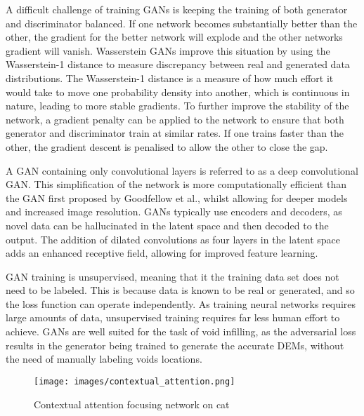 \documentclass[twocolumn]{article}
\begin{document}
A difficult challenge of training GANs is keeping the training of both generator and discriminator balanced.
If one network becomes substantially better than the other, the gradient for the better network will explode and the other networks gradient will vanish.
Wasserstein GANs\autocite{arjovskyWassersteinGenerativeAdversarial2017} improve this situation by using the Wasserstein-1 distance to measure discrepancy between real and generated data distributions.
The Wasserstein-1 distance is a measure of how much effort it would take to move one probability density into another, which is continuous in nature, leading to more stable gradients.
To further improve the stability of the network, a gradient penalty can be applied to the network to ensure that both generator and discriminator train at similar rates\autocite{gulrajaniImprovedTrainingWasserstein2017}.
If one trains faster than the other, the gradient descent is penalised to allow the other to close the gap.

A GAN containing only convolutional layers is referred to as a deep convolutional GAN\autocite{radfordUnsupervisedRepresentationLearning2016}.
This simplification of the network is more computationally efficient than the GAN first proposed by Goodfellow et al.\autocite{goodfellowGenerativeAdversarialNetworks2020}, whilst allowing for deeper models and increased image resolution.
GANs typically use encoders and decoders, as novel data can be hallucinated in the latent space and then decoded to the output.
The addition of dilated convolutions\autocite{yuMultiScaleContextAggregation2016} as four layers in the latent space adds an enhanced receptive field, allowing for improved feature learning.

GAN training is unsupervised, meaning that it the training data set does not need to be labeled.
This is because data is known to be real or generated, and so the loss function can operate independently.
As training neural networks requires large amounts of data, unsupervised training requires far less human effort to achieve.
GANs are well suited for the task of void infilling, as the adversarial loss results in the generator being trained to generate the accurate DEMs, without the need of manually labeling voids locations.

\begin{figure}[htbp]
\centering
\texttt{[image: images/contextual\_attention.png]}
\caption{\label{fig:contextual_attention}Contextual attention focusing network on cat \autocite{zhangAgileAmuletRealTime2018}}
\end{figure}
\end{document}
